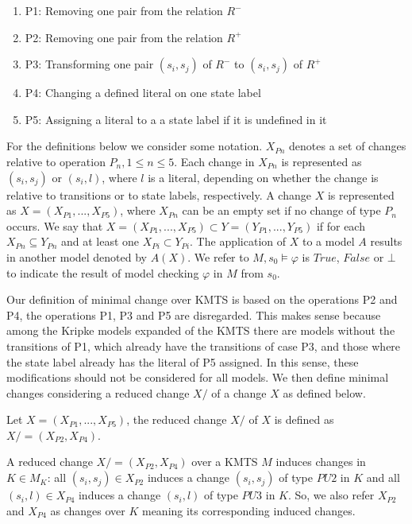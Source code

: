 \documentclass{llncs}
\begin{document}
\begin{enumerate} 
\item[] {P1:} Removing one pair from the relation $R^{-}$
\item[] {P2:} Removing one pair from the relation $R^{+}$
\item[] {P3:} Transforming one pair $(s_{i},s_{j})$ of $R^{-}$ to $(s_{i},s_{j})$ of $R^{+}$
\item[] {P4:} Changing a defined literal on one state label 
\item[] {P5:} Assigning a literal to a a state label if it is undefined in it 
\end{enumerate}

For the definitions below we consider some notation. $X_{Pn}$ denotes a set of changes relative to operation $P_{n}, 1 \leq n \leq  5$. Each change in $X_{Pn}$ is represented as $(s_{i}, s_{j})$ or $(s_{i},l)$, where $l$ is a literal, depending on whether the change is relative to transitions or to state labels, respectively. A change $X$ is represented as $X = (X_{P1},..., X_{P5})$, where $X_{Pn}$ can be an empty set if no change of type $P_{n}$ occurs. We say that $X = (X_{P1},..., X_{P5})  \subset  Y = (Y_{P1},..., Y_{P5})$ if for each $X_{Pn} \subseteq Y_{Pn}$ and at least one $X_{Pi} \subset Y_{Pi}$. The application of $X$ to a model $A$ results in another model denoted by $A(X)$. We refer to $M,s_{0} \models \varphi$ is $True$, $False$ or $\bot$ to indicate the result of model checking $\varphi$ in $M$ from $s_{0}$. 

Our definition of minimal change over KMTS is based on the operations P2 and P4, the operations P1, P3 and P5 are disregarded. This makes sense because among the Kripke models expanded of the KMTS there are models without the transitions of P1, which already have the transitions of case P3, and those where the state label already has the literal of P5 assigned. In this sense, these modifications should not be considered for all models. We then define minimal changes considering a reduced change $X/$ of a change $X$ as defined below.

\begin{definition}
Let $X = (X_{P1},..., X_{P5})$, the reduced change $X/$ of $X$ is defined as $X/ = (X_{P2},X_{P4})$. 
\end{definition}

A reduced change $X/ = (X_{P2}, X_{P4})$ over a KMTS $M$ induces changes in $K \in M_{K}$: all $(s_{i}, s_{j}) \in X_{P2}$ induces a change $(s_{i}, s_{j})$ of type $PU2$ in $K$ and all $(s_{i}, l) \in X_{P4}$ induces a change $(s_{i}, l)$ of type $PU3$ in $K$. So, we also refer $X_{P2}$ and $X_{P4}$ as changes over $K$ meaning its corresponding induced changes.
\end{document}
